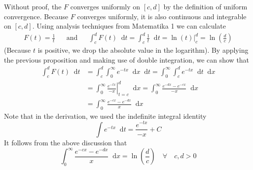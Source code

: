 \documentclass[11pt, a4paper]{article}
\newcommand{\diff}{\mathop{}\!\mathrm{d}} %
\begin{document}
Without proof, the $ F $ converges uniformly on $ [c, d] $ by the definition of uniform convergence. Because $ F $ converges uniformly, it is also continuous and integrable on $ [c, d] $. 
Using analysis techniques from Matematika 1 we can calculate
\begin{align*}
	F(t) = \frac{1}{t} && \text{and} && \int_{c}^{d}F(t)\diff t= \int_{c}^{d}\frac{1}{t}\diff t = \ln(t) \Big|^d_c = \ln(\frac{d}{c})
\end{align*}
(Because $ t $ is positive, we drop the absolute value in the logarithm). By applying the previous proposition and making use of double integration, we can show that
\begin{align*}
\int_{c}^{d}F(t)\diff t &= \int_{c}^{d} \int_{0}^{\infty} e^{-tx} \diff x \diff t = \int_{0}^{\infty} \int_{c}^{d} e^{-tx} \diff t \diff x\\[1.5ex]
& = \int_{0}^{\infty} \left.\frac{e^{-tx}}{-x} \right |_{t=c}^d \diff x = \int_{0}^{\infty}\frac{e^{-dx} - e^{-cx}}{-x} \diff x\\[1.5ex] 
& = \int_{0}^{\infty}\frac{e^{-cx} - e^{-dx}}{x} \diff x
\end{align*}
Note that in the derivation, we used the indefinite integral identity
\begin{equation*}
\int e^{-tx} \diff t = \frac{e^{-tx}}{-x} + C
\end{equation*}
It follows from the above discussion that
\begin{equation*}
\int_{0}^{\infty}\frac{e^{-cx} - e^{-dx}}{x} \diff x = \ln(\frac{d}{c}) \quad \forall \quad c, d > 0
\end{equation*}
\end{document}
